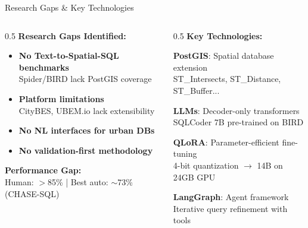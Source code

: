 \documentclass{beamer}
\begin{document}
\begin{frame}{Research Gaps \& Key Technologies}
\begin{columns}
\begin{column}{0.5\textwidth}
\textbf{Research Gaps Identified:}
\begin{itemize}
    \item \textbf{No Text-to-Spatial-SQL benchmarks}\\
    {\small Spider/BIRD lack PostGIS coverage}
    \item \textbf{Platform limitations}\\
    {\small CityBES, UBEM.io lack extensibility}
    \item \textbf{No NL interfaces for urban DBs}
    \item \textbf{No validation-first methodology}
\end{itemize}

\vspace{0.1cm}
\textbf{Performance Gap:}\\
Human: $>$85\% | Best auto: $\sim$73\% (CHASE-SQL)
\end{column}
\begin{column}{0.5\textwidth}
\textbf{Key Technologies:}

\vspace{0.1cm}
\textbf{PostGIS}: Spatial database extension\\
{\small ST\_Intersects, ST\_Distance, ST\_Buffer...}

\vspace{0.1cm}
\textbf{LLMs}: Decoder-only transformers\\
{\small SQLCoder 7B pre-trained on BIRD}

\vspace{0.1cm}
\textbf{QLoRA}: Parameter-efficient fine-tuning\\
{\small 4-bit quantization $\rightarrow$ 14B on 24GB GPU}

\vspace{0.1cm}
\textbf{LangGraph}: Agent framework\\
{\small Iterative query refinement with tools}
\end{column}
\end{columns}
\end{frame}

\end{document}

